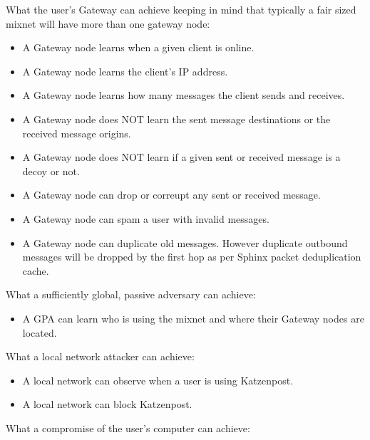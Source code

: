 \documentclass{article}
\begin{document}
\noindent What the user's Gateway can achieve keeping in mind that
typically a fair sized mixnet will have more than one gateway node:\\

\begin{itemize}
    \item A Gateway node learns when a given client is online.
    \item A Gateway node learns the client's IP address.
    \item A Gateway node learns how many messages the client sends and receives.
    \item A Gateway node does NOT learn the sent message destinations or the received message origins.
    \item A Gateway node does NOT learn if a given sent or received message is a decoy or not.
    \item A Gateway node can drop or correupt any sent or received message.
    \item A Gateway node can spam a user with invalid messages.
    \item A Gateway node can duplicate old messages. However duplicate outbound messages will be dropped by the first hop as per Sphinx packet deduplication cache.
\end{itemize}
\vspace*{5px}

\noindent What a sufficiently global, passive adversary can achieve:\\

\begin{itemize}
    \item A GPA can learn who is using the mixnet and where their Gateway nodes are located.
\end{itemize}
\vspace*{5px}

What a local network attacker can achieve:\\

\begin{itemize}
    \item A local network can observe when a user is using Katzenpost.
    \item A local network can block Katzenpost.
\end{itemize}
\vspace*{5px}

\noindent What a compromise of the user's computer can achieve:\\
\end{document}
